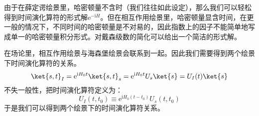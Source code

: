 由于在薛定谔绘景里，哈密顿量不含时（我们往往如此设定），那么我们可以轻松得到时间演化算符的形式解$\mathrm{e}^{-\mathrm{i}H}$。但在相互作用绘景里，哈密顿量显含时间，在更一般的情况下，不同时间的哈密顿量是不对易的，因此指数上的因子不能简单地写成单一的哈密顿量积分形式。对戴森级数的简化可以给出一个简洁的形式解。

在场论里，相互作用绘景与海森堡绘景会联系到一起。因此我们需要得到两个绘景下时间演化算符的关系。
\begin{equation}
\ket{s,t}_I=\mathrm{e} ^{\mathrm{i}H_0t}\ket{s,t}_s=\mathrm{e} ^{\mathrm{i}H_0t}U_s\ket{s}=U_I(t)\ket{s}
\end{equation}
不失一般性，把时间演化算符定义为：
\begin{equation}
U_I(t,t_0)\equiv\mathrm{e} ^{\mathrm{i}H_0(t-t_0)}U_s(t,t_0)
\end{equation}
于是我们可以得到两个绘景下的时间演化算符关系。





